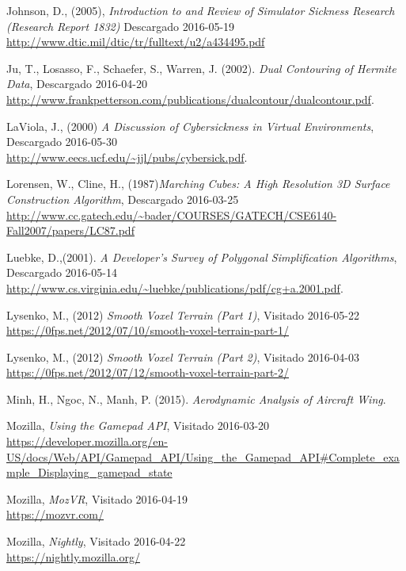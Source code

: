 \documentclass[12pt]{article}
\begin{document}
\begin{thebibliography}{9}
Johnson, D., (2005), \textit{Introduction to and Review of Simulator Sickness Research (Research Report 1832)}
Descargado 2016-05-19 
\\\url{http://www.dtic.mil/dtic/tr/fulltext/u2/a434495.pdf}

Ju, T., Losasso, F., Schaefer, S., Warren, J. (2002). \textit{Dual Contouring of Hermite Data},
Descargado 2016-04-20 
\\\url{http://www.frankpetterson.com/publications/dualcontour/dualcontour.pdf}.

LaViola, J., (2000) \textit{A Discussion of Cybersickness in Virtual Environments},
Descargado 2016-05-30 
\\\url{http://www.eecs.ucf.edu/~jjl/pubs/cybersick.pdf}.

Lorensen, W., Cline, H., (1987)\textit{Marching Cubes: A High Resolution 3D Surface Construction Algorithm},
Descargado 2016-03-25 
\\\url{http://www.cc.gatech.edu/~bader/COURSES/GATECH/CSE6140-Fall2007/papers/LC87.pdf}

Luebke, D.,(2001). \textit{A Developer's Survey of Polygonal Simplification Algorithms},
Descargado 2016-05-14
\\\url{http://www.cs.virginia.edu/~luebke/publications/pdf/cg+a.2001.pdf}.

Lysenko, M., (2012) \textit{Smooth Voxel Terrain (Part 1)},
Visitado 2016-05-22
\\\url{https://0fps.net/2012/07/10/smooth-voxel-terrain-part-1/}

Lysenko, M., (2012) \textit{Smooth Voxel Terrain (Part 2)},
Visitado 2016-04-03
\\\url{https://0fps.net/2012/07/12/smooth-voxel-terrain-part-2/}

Minh, H., Ngoc, N., Manh, P. (2015). \textit{Aerodynamic Analysis of Aircraft Wing}. 

Mozilla, \textit{Using the Gamepad API},
Visitado 2016-03-20
\\\url{https://developer.mozilla.org/en-US/docs/Web/API/Gamepad_API/Using_the_Gamepad_API#Complete_example_Displaying_gamepad_state}

Mozilla, \textit{MozVR},
Visitado 2016-04-19
\\\url{https://mozvr.com/}

Mozilla, \textit{Nightly},
Visitado 2016-04-22
\\\url{https://nightly.mozilla.org/}


\end{thebibliography}
\end{document}
